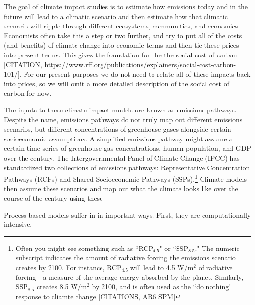 The goal of climate impact studies is to estimate how emissions today and in the future will lead to a climatic scenario and then estimate how that climatic scenario will ripple through different ecosystems, communities, and economies. Economists often take this a step or two further, and try to put all of the costs (and benefits) of climate change into economic terms and then tie these prices into present terms. This gives the foundation for the the social cost of carbon [CITATION, https://www.rff.org/publications/explainers/social-cost-carbon-101/]. For our present purposes we do not need to relate all of these impacts back into prices, so we will omit a more detailed description of the social cost of carbon for now. 

The inputs to these climate impact models are known as emissions pathways. Despite the name, emissions pathways do not truly map out different emissions scenarios, but different concentrations of greenhouse gases alongside certain socioeconomic assumptions. A simplified emissions pathway might assume a certain time series of greenhouse gas concentrations, human population, and GDP over the century. The Intergovernmental Panel of Climate Change (IPCC) has standardized two collections of emissions pathways: Representative Concentration Pathways (RCPs) and Shared Socioeconomic Pathways (SSPs).\footnote{Often you might see something such as ``RCP$_{4.5}$" or ``SSP$_{8.5}$." The numeric subscript indicates the amount of radiative forcing the emissions scenario creates by 2100. For instance, RCP$_{4.5}$ will lead to 4.5 W/m$^2$ of radiative forcing---a measure of the average energy absorbed by the planet. Similarly, SSP$_8.5$ creates 8.5 W/m$^2$ by 2100, and is often used as the ``do nothing" response to cliamte change [CITATIONS, AR6 SPM]} Climate models then assume these scenarios and map out what the climate looks like over the course of the century using these 


Process-based models suffer in in important ways. First, they are computationally intensive. 



